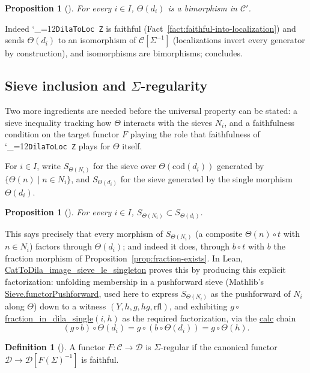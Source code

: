 \documentclass[11pt]{amsart}
\newcommand{\lc}[1]{\url{#1}}
\newcommand{\lcode}{\begingroup\catcode`\_=12\relax\lcodeInner}
\newcommand{\lcodeInner}[1]{\texttt{#1}\endgroup}
\theoremstyle{plain}
\newtheorem{proposition}[theorem]{Proposition}
\theoremstyle{definition}
\newtheorem{definition}[theorem]{Definition}
\theoremstyle{remark}
\newcommand{\calC}{\mathcal C}
\newcommand{\calD}{\mathcal D}
\newcommand{\cod}{\mathrm{cod}}
\begin{document}
\begin{proposition}[{\citep[Proposition~3.3]{Mayeux}}]
For every $i \in I$, $\Theta(d_i)$ is a bimorphism in $\calC'$.
\end{proposition}

Indeed \lcode{DilaToLoc Z} is faithful (Fact~\ref{fact:faithful-into-localization}) and sends
$\Theta(d_i)$ to an isomorphism of $\calC[\Sigma^{-1}]$ (localizations invert every generator
by construction), and isomorphisms are bimorphisms; \citep[Fact~3.2]{Mayeux} concludes.

\subsection{Sieve inclusion and $\Sigma$-regularity}
\label{sec:sigma-regular}

Two more ingredients are needed before the universal property can be stated: a sieve
inequality tracking how $\Theta$ interacts with the sieves $N_i$, and a faithfulness
condition on the target functor $F$ playing the role that faithfulness of
\lcode{DilaToLoc Z} plays for $\Theta$ itself.

For $i \in I$, write $S_{\Theta(N_i)}$ for the sieve over $\Theta(\cod(d_i))$ generated by
$\{\Theta(n) \mid n \in N_i\}$, and $S_{\Theta(d_i)}$ for the sieve generated by the single
morphism $\Theta(d_i)$.

\begin{proposition}[{\citep[Proposition~3.5]{Mayeux}}]
\label{prop:sieve-inclusion}
For every $i \in I$, $S_{\Theta(N_i)} \subset S_{\Theta(d_i)}$.
\end{proposition}

This says precisely that every morphism of $S_{\Theta(N_i)}$ (a composite $\Theta(n)\circ t$
with $n \in N_i$) factors through $\Theta(d_i)$; and indeed it does, through
$b \circ t$ with $b$ the fraction morphism of Proposition~\ref{prop:fraction-exists}. In Lean,
\lc{CatToDila_image_sieve_le_singleton} proves this by producing this explicit factorization:
unfolding membership in a pushforward sieve (Mathlib's \lc{Sieve.functorPushforward}, used
here to express $S_{\Theta(N_i)}$ as the pushforward of $N_i$ along $\Theta$) down to a
witness $(Y,h,g,hg,\text{rfl})$, and exhibiting $g \circ $\lc{fraction_in_dila_single}$(i,h)$ as
the required factorization, via the \lc{calc} chain
\[
(g \circ b) \circ \Theta(d_i) = g \circ (b \circ \Theta(d_i)) = g \circ \Theta(h).
\]

\begin{definition}[{\citep[Definition~3.6]{Mayeux}}]
\label{def:sigma-regular}
A functor $F : \calC \to \calD$ is $\Sigma$-regular if the canonical functor
$\calD \to \calD[F(\Sigma)^{-1}]$ is faithful.
\end{definition}
\end{document}
